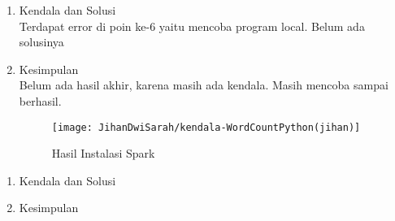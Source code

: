 \begin{enumerate}
\item Kendala dan Solusi \\
Terdapat error di poin ke-6 yaitu mencoba program local. Belum ada solusinya 

\item Kesimpulan\\
Belum ada hasil akhir, karena masih ada kendala. Masih mencoba sampai berhasil.
\begin{figure}[!ht]
\texttt{[image: JihanDwiSarah/kendala-WordCountPython(jihan)]}
\caption{Hasil Instalasi Spark}
\label{gam:kendala-WordCountPython(jihan)}
\end{figure}


\end{enumerate}

\begin{enumerate}
\item Kendala dan Solusi \\

\item Kesimpulan\\

\end{enumerate}

